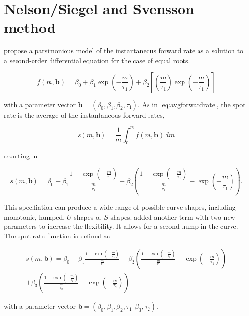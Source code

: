 \newpage
\section{Nelson/Siegel and Svensson method}
\label{sec:nels-svenss-meth}

\cite{Nelson1987} propose a parsimonious  model of  the instantaneous forward rate as a solution to a second-order differential equation for the case of equal roots.

\begin{equation}
  \label{eq:laguerre}
  f(m,\bm{b}) = \beta_0+\beta_1\exp\left(-\frac{m}{\tau_1}\right)+\beta_2\left[\left(\frac{m}{\tau_1}\right)\exp\left(-\frac{m}{\tau_1}\right)\right]
\end{equation}

with a parameter vector ${\bm{b}} = \left(\beta_0,\beta_1,\beta_2,\tau_1\right)$. As in \eqref{eq:avgforwardrate}, the spot rate is the average of the instantaneous forward rates,

\begin{equation*}
  \label{eq:intspotrate}
  s(m,\bm{b})=\frac{1}{m}\int_0^mf(m,\bm{b})\,dm
\end{equation*}

resulting in

\begin{equation}
  \label{eq:nelson-spot}
   s(m,\bm{b}) = \beta_0 + \beta_1\frac{1-\exp(-\frac{m}{\tau_1})}{\frac{m}{\tau_1}} + \beta_2\left(\frac{1-\exp(-\frac{m}{\tau_1})}{\frac{m}{\tau_1}} - \exp(-\frac{m}{\tau_1})\right).
\end{equation}

 
This specifiation can produce a wide range of possible curve shapes, including monotonic, humped, $U$-shapes or $S$-shapes. \cite{Svensson1994} added another term with two new parameters to increase the flexibility. It allows for a second hump in the curve. The spot rate function is defined as


\begin{multline}\label{eq:svensson-spot}
    s(m,\bm{b}) = \beta_0 + \beta_1\frac{1-\exp(-\frac{m}{\tau_1})}{\frac{m}{\tau_1}} + \beta_2\left(\frac{1-\exp(-\frac{m}{\tau_1})}{\frac{m}{\tau_1}} - \exp(-\frac{m}{\tau_1})\right) \\+ \beta_3\left(\frac{1-\exp(-\frac{m}{\tau_2})}{\frac{m}{\tau_2}} - \exp(-\frac{m}{\tau_2})\right)
\end{multline}



with a parameter vector ${\bm{b}} = \left(\beta_0,\beta_1,\beta_2,\tau_1,\beta_3,\tau_2\right)$.

